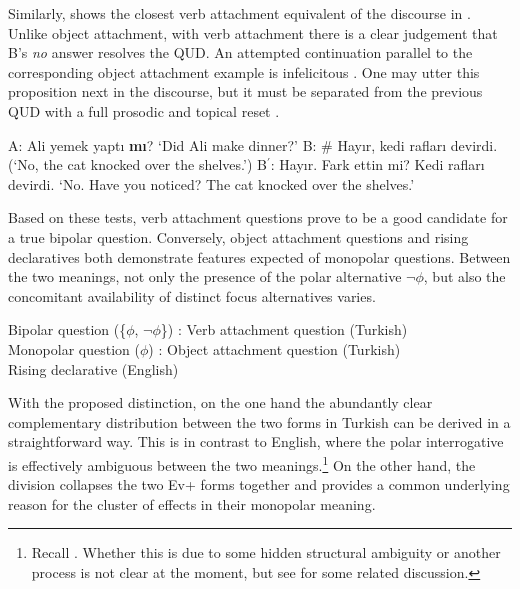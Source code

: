 \documentclass[output=paper,colorlinks,citecolor=brown]{langscibook}
\begin{document}
\label{propalt-va}
\z

Similarly,  shows the closest verb attachment equivalent of the discourse in . Unlike object attachment, with verb attachment there is a clear judgement that B's \textit{no} answer resolves the QUD. An attempted continuation parallel to the corresponding object attachment example is infelicitous . One may utter this proposition next in the discourse, but it must be separated from the previous QUD with a full prosodic and topical reset . 

\ea\label{cat-va} 
\ea A: Ali yemek  yaptı{ }\textbf{mı}?
\glt `Did Ali make dinner?'
\ex \label{cat-va:a} B: \# Hayır, kedi rafları{ }devirdi.
\glt (`No, the cat knocked over the shelves.’)
\ex \label{cat-va:b} B$^{\prime}$: Hayır. Fark ettin mi? Kedi rafları{ }devirdi.
\glt `No. Have you noticed? The cat knocked over the shelves.'
\z
\z

Based on these tests, verb attachment questions prove to be a good candidate for a true bipolar question. Conversely, object attachment questions and rising declaratives both demonstrate features expected of monopolar questions. Between the two meanings, not only the presence of the polar alternative $\neg\phi$, but also the concomitant availability of distinct focus alternatives varies.

\ea
Bipolar question (\{$\phi$, $\neg\phi$\}) : Verb attachment question (Turkish) \\
Monopolar question ($\phi$) : Object attachment question (Turkish)\\
\phantom{Monopolar questoon ($\phi$) :} Rising declarative (English)
\z

With the proposed distinction, on the one hand the abundantly clear complementary distribution between the two forms in Turkish can be derived in a straightforward way. This is in contrast to English, where the polar interrogative is effectively ambiguous between the two meanings.\footnote{Recall . Whether this is due to some hidden structural ambiguity or another process is not clear at the moment, but see  for some related discussion.} On the other hand, the division collapses the two Ev+ forms together and provides a common underlying reason for the cluster of effects in their monopolar meaning. 
\end{document}
